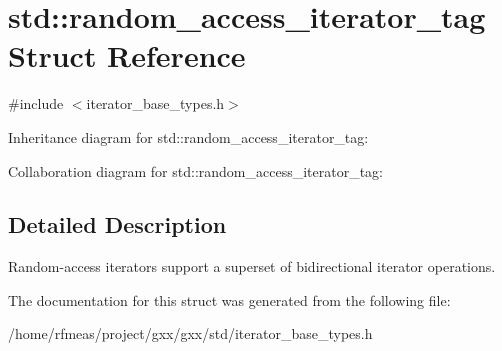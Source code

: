\hypertarget{structstd_1_1random__access__iterator__tag}{}\section{std\+:\+:random\+\_\+access\+\_\+iterator\+\_\+tag Struct Reference}
\label{structstd_1_1random__access__iterator__tag}


{\ttfamily \#include $<$iterator\+\_\+base\+\_\+types.\+h$>$}



Inheritance diagram for std\+:\+:random\+\_\+access\+\_\+iterator\+\_\+tag\+:


Collaboration diagram for std\+:\+:random\+\_\+access\+\_\+iterator\+\_\+tag\+:


\subsection{Detailed Description}
Random-\/access iterators support a superset of bidirectional iterator operations. 

The documentation for this struct was generated from the following file\+:\begin{DoxyCompactItemize}
\item 
/home/rfmeas/project/gxx/gxx/std/iterator\+\_\+base\+\_\+types.\+h\end{DoxyCompactItemize}
